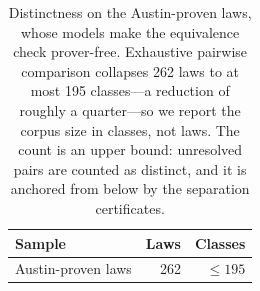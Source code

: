 \begin{table}[t]
\centering
\small
\begin{tabular}{lrr}
\toprule
Sample & Laws & Classes \\
\midrule
Austin-proven laws & 262 & $\leq 195$ \\
\bottomrule
\end{tabular}
\caption{Distinctness on the Austin-proven laws, whose models make the equivalence check
prover-free. Exhaustive pairwise comparison collapses 262 laws to at most 195 classes---a
reduction of roughly a quarter---so we report the corpus size in classes, not laws. The
count is an upper bound: unresolved pairs are counted as distinct, and it is anchored from
below by the separation certificates. %
}
\label{tab:distinctness}
\end{table}


